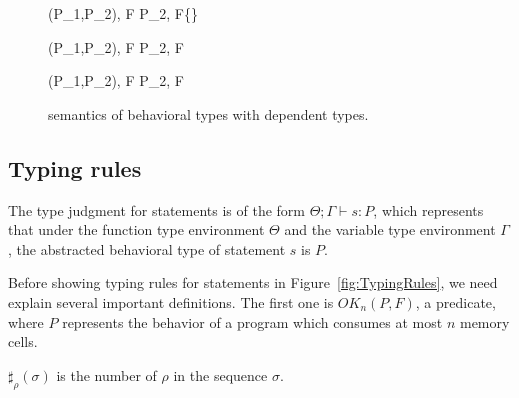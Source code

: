 \begin{figure}
\begin{minipage}{\textwidth}
{ \langle \Sirx (P_1,P_2), F \rangle \rightarrow \langle P_2, F\cup\{\snnull\} \rangle }

{ \langle \Sirx (P_1,P_2), F \rangle \rightarrow \langle P_2, F \rangle }

{ \langle \Sirx (P_1,P_2), F \rangle \rightarrow \langle P_2, F \rangle }

 



\end{minipage}
\caption{semantics of behavioral types with dependent types.}
\label{fig:bdRules}
\end{figure}

\subsection{Typing rules}
The type judgment for statements is of the form \(\Theta; \Gamma
\vdash s : P \), which represents that under the function type
environment \(\Theta\) and the variable type environment \(\Gamma\),
the abstracted behavioral type of statement \(s\) is \(P\).

Before showing typing rules for statements in
Figure~\ref{fig:TypingRules}, we need explain several important
definitions. The first one is \(OK_n(P, F)\), a predicate, where \(P\)
represents the behavior of a program which consumes at most \(n\)
memory cells.

\begin{myDef}[\(\sharp_{\rho}(\sigma)\)]
\label{df:sharf}
\(\sharp_{\rho}(\sigma)\) is the number of \(\rho\) in the sequence
\(\sigma\).
\end{myDef}



